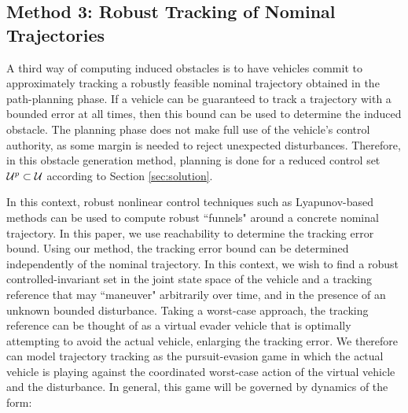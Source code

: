 \subsection{Method 3: Robust Tracking of Nominal Trajectories \label{sec:rtt}}
A third way of computing induced obstacles is to have vehicles commit to approximately tracking a robustly feasible nominal trajectory obtained in the path-planning phase. If a vehicle can be guaranteed to track a trajectory with a bounded error at all times, then this bound can be used to determine the induced obstacle. The planning phase does not make full use of the vehicle's control authority, as some margin is needed to reject unexpected disturbances. Therefore, in this obstacle generation method, planning is done for a reduced control set $\mathcal{U}^p\subset\mathcal{U}$ according to Section \ref{sec:solution}.


In this context, robust nonlinear control techniques such as Lyapunov-based methods \cite{Majumdar2013} can be used to compute robust ``funnels" around a concrete nominal trajectory. In this paper, we use reachability to determine the tracking error bound. Using our method, the tracking error bound can be determined independently of the nominal trajectory. In this context, we wish to find a robust controlled-invariant set in the joint state space of the vehicle and a tracking reference that may ``maneuver" arbitrarily over time, and in the presence of an unknown bounded disturbance. Taking a worst-case approach, the tracking reference can be thought of as a virtual evader vehicle that is optimally attempting to avoid the actual vehicle, enlarging the tracking error. We therefore can model trajectory tracking as the pursuit-evasion game in which the actual vehicle is playing against the coordinated worst-case action of the virtual vehicle and the disturbance. In general, this game will be governed by dynamics of the form:

